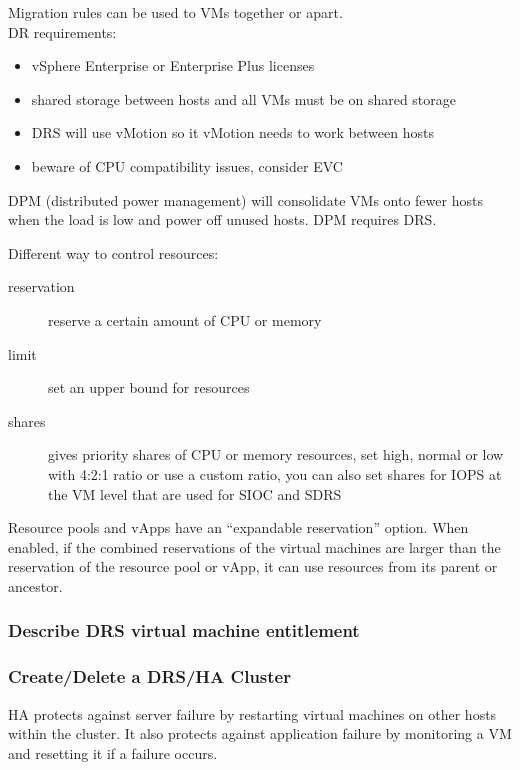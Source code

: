 Migration rules can be used to VMs together or apart.\\

DR requirements:

\begin{itemize}
\item vSphere Enterprise or Enterprise Plus licenses
\item shared storage between hosts and all VMs must be on shared storage
\item DRS will use vMotion so it vMotion needs to work between hosts
\item beware of CPU compatibility issues, consider EVC
\end{itemize}

DPM (distributed power management) will consolidate VMs onto fewer hosts when
the load is low and power off unused hosts. DPM requires DRS.

Different way to control resources:

\begin{description}

\item[reservation]
reserve a certain amount of CPU or memory

\item[limit]
set an upper bound for resources

\item[shares]
gives priority shares of CPU or memory resources, set high, normal or low
with 4:2:1 ratio or use a custom ratio, you can also set shares for IOPS
at the VM level that are used for SIOC and SDRS

\end{description}

Resource pools and vApps have an ``expandable reservation'' option. When
enabled, if the combined reservations of the virtual machines are larger
than the reservation of the resource pool or vApp, it can use resources from
its parent or ancestor.

\subsubsection{Describe DRS virtual machine entitlement}

\subsubsection{Create/Delete a DRS/HA Cluster}

HA protects against server failure by restarting virtual machines on other
hosts within the cluster. It also protects against application failure by
monitoring a VM and resetting it if a failure occurs.\\

